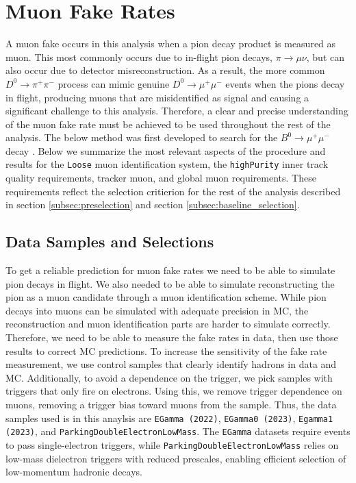 \section{Muon Fake Rates}
\label{sec:muon_fake_rate}

A muon fake occurs in this analysis when a pion decay product is measured as muon. This most commonly occurs due to in-flight pion decays, $\pi \to \mu \nu$, but can also occur due to detector misreconstruction. As a result, the more common $D^0 \to \pi^+ \pi^-$ process can mimic genuine $D^0 \to \mu^+ \mu^-$ events when the pions decay in flight, producing muons that are misidentified as signal and causing a significant challenge to this analysis. Therefore, a clear and precise understanding of the muon fake rate must be achieved to be used throughout the rest of the analysis. The below method was first developed to search for the $B^0 \to \mu^+ \mu^-$ decay \cite{ref:2023b0mumu}. Below we summarize the most relevant aspects of the procedure and results for the \texttt{Loose} muon identification system, the \texttt{highPurity} inner track quality requirements, tracker muon, and global muon requirements. These requirements reflect the selection critierion for the rest of the analysis described in section \ref{subsec:preselection} and section \ref{subsec:baseline_selection}.

\subsection{Data Samples and Selections}

To get a reliable prediction for muon fake rates we need to be able to simulate pion decays in flight. We also needed to be able to simulate reconstructing the pion as a muon candidate through a muon identification scheme. While pion decays into muons can be simulated with adequate precision in MC, the reconstruction and muon identification parts are harder to simulate correctly. Therefore, we need to be able to measure the fake rates in data, then use those results to correct MC predictions. To increase the sensitivity of the fake rate measurement, we use control samples that clearly identify hadrons in data and MC. Additionally, to avoid a dependence on the trigger, we pick samples with triggers that only fire on  electrons. Using this, we remove trigger dependence on muons, removing a trigger  bias toward muons from the sample. Thus, the data samples used is in this anaylsis are \texttt{EGamma (2022)}, \texttt{EGamma0 (2023)}, \texttt{Egamma1 (2023)}, and \texttt{ParkingDoubleElectronLowMass}. The \texttt{EGamma} datasets require events to pass single-electron triggers, while \texttt{ParkingDoubleElectronLowMass} relies on low-mass dielectron triggers with reduced prescales, enabling efficient selection of low-momentum hadronic decays.

